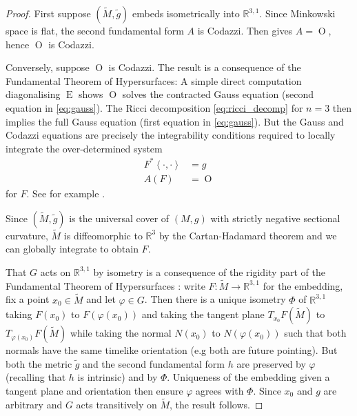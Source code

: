 \documentclass{cambridge7a}
\renewcommand{\~}{\tilde}
\renewcommand{\-}{\bar}
\newcommand{\R}{\mathbb{R}}
\newcommand{\8}{\infty}
\newcommand{\inpr}[2]{\left\langle #1,#2 \right\rangle}
\DeclareMathOperator{\Ein}{E}
\DeclareMathOperator{\Ob}{O}
\begin{document}
\begin{proof}
First suppose \((\tilde{M}, \tilde{g})\) embeds isometrically into \(\R^{3,1}\). Since Minkowski space is flat, the second fundamental form \(A\) is Codazzi. Then  gives \(A = \Ob\), hence \(\Ob\) is Codazzi.

Conversely, suppose \(\Ob\) is Codazzi. The result is a consequence of the Fundamental Theorem of Hypersurfaces: A simple direct computation diagonalising \(\Ein\) shows $\Ob$ solves the contracted Gauss equation (second equation in \eqref{eq:gauss}). The Ricci decomposition \eqref{eq:ricci_decomp} for \(n=3\) then implies the full Gauss equation (first equation in \eqref{eq:gauss}). But the Gauss and Codazzi equations are precisely the integrability conditions required to locally integrate the over-determined system
\begin{align*}
F^{\ast} \inpr{\cdot}{\cdot} &= g \\
A(F) &= \Ob
\end{align*}
for \(F\). See for example \cite[Theorem 7.1]{MR1393941}.

Since \((\tilde{M}, \tilde{g})\) is the universal cover of \((M, g)\) with strictly negative sectional curvature, \(\tilde{M}\) is diffeomorphic to \(\R^3\) by the Cartan-Hadamard theorem and we can globally integrate to obtain \(F\).

That \(G\) acts on \(\R^{3,1}\) by isometry is a consequence of the rigidity part of the Fundamental Theorem of Hypersurfaces \cite[Theorem 7.2]{MR1393941}: write \(F : \tilde{M} \to \R^{3,1}\) for the embedding, fix a point \(x_0 \in \tilde{M}\) and let \(\varphi \in G\). Then there is a unique isometry \(\Phi\) of \(\R^{3,1}\) taking \(F(x_0)\) to \(F(\varphi(x_0))\) and taking the tangent plane \(T_{x_0} F(\tilde{M})\) to \(T_{\varphi(x_0)} F(\tilde{M})\) while taking the normal \(N(x_0)\) to \(N(\varphi(x_0))\) such that both normals have the same timelike orientation (e.g both are future pointing). But both the metric \(\tilde{g}\) and the second fundamental form \(h\) are preserved by \(\varphi\) (recalling that \(h\) is intrinsic) and by \(\Phi\). Uniqueness of the embedding given a tangent plane and orientation then ensure \(\varphi\) agrees with \(\Phi\). Since \(x_0\) and \(g\) are arbitrary and \(G\) acts transitively on \(\tilde{M}\), the result follows.
\end{proof}
\end{document}
